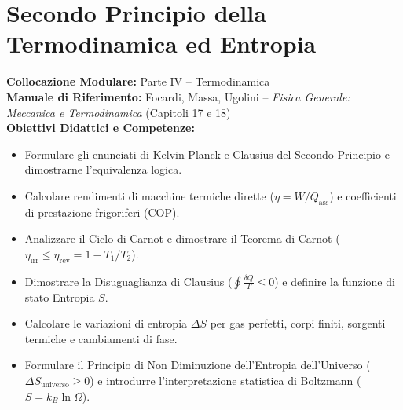 \chapter{Secondo Principio della Termodinamica ed Entropia}
\label{chap:secondo_principio_entropia}

\begin{tcolorbox}[enhanced, breakable, colback=navyblue!4!white, colframe=navyblue!80!black,
    coltitle=white, fonttitle=\bfseries\sffamily, title={Quadro Sinottico del Capitolo 15},
    sharp corners, rounded corners=south, boxrule=1pt]
\textbf{Collocazione Modulare:} Parte IV -- Termodinamica\\
\textbf{Manuale di Riferimento:} Focardi, Massa, Ugolini -- \emph{Fisica Generale: Meccanica e Termodinamica} (Capitoli 17 e 18)\\
\textbf{Obiettivi Didattici e Competenze:}\par
\begin{itemize}
    \item Formulare gli enunciati di Kelvin-Planck e Clausius del Secondo Principio e dimostrarne l'equivalenza logica.
    \item Calcolare rendimenti di macchine termiche dirette ($\eta = W/Q_{\text{ass}}$) e coefficienti di prestazione frigoriferi ($\text{COP}$).
    \item Analizzare il Ciclo di Carnot e dimostrare il Teorema di Carnot ($\eta_{\text{irr}} \le \eta_{\text{rev}} = 1 - T_1/T_2$).
    \item Dimostrare la Disuguaglianza di Clausius ($\oint \frac{\delta Q}{T} \le 0$) e definire la funzione di stato Entropia $S$.
    \item Calcolare le variazioni di entropia $\Delta S$ per gas perfetti, corpi finiti, sorgenti termiche e cambiamenti di fase.
    \item Formulare il Principio di Non Diminuzione dell'Entropia dell'Universo ($\Delta S_{\text{universo}} \ge 0$) e introdurre l'interpretazione statistica di Boltzmann ($S = k_B \ln\Omega$).
\end{itemize}
\end{tcolorbox}

\vspace{0.5em}

